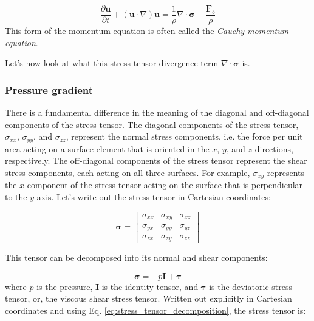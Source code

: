 \documentclass[12pt]{article}
\numberwithin{equation}{section}
\numberwithin{figure}{section}
\numberwithin{table}{section}
\begin{document}
\begin{equation}
  \frac{\partial \mathbf{u}}{\partial t} + (\mathbf{u} \cdot \nabla) \mathbf{u} =
  \frac{1}{\rho} \nabla \cdot \boldsymbol{\sigma} + \frac{\mathbf{F}_b}{\rho}
\end{equation}
This form of the momentum equation is often called the
\textit{Cauchy momentum equation}.

Let's now look at what this stress tensor divergence term
$\nabla \cdot \boldsymbol{\sigma}$ is.

\subsubsection{Pressure gradient}

There is a fundamental difference in the meaning of the diagonal and off-diagonal
components of the stress tensor.
The diagonal components of the stress tensor, $\sigma_{xx}$, $\sigma_{yy}$, and
$\sigma_{zz}$, represent the normal stress components, i.e. the force per unit
area acting on a surface element that is oriented in the $x$, $y$, and $z$
directions, respectively.
The off-diagonal components of the stress tensor represent the shear stress
components, each acting on all three surfaces.
For example, $\sigma_{xy}$ represents the $x$-component of the stress tensor
acting on the surface that is perpendicular to the $y$-axis.
Let's write out the stress tensor in Cartesian coordinates:

\begin{equation}
  \boldsymbol{\sigma} = \begin{bmatrix}
    \sigma_{xx} & \sigma_{xy} & \sigma_{xz} \\
    \sigma_{yx} & \sigma_{yy} & \sigma_{yz} \\
    \sigma_{zx} & \sigma_{zy} & \sigma_{zz}
  \end{bmatrix}
\end{equation}

This tensor can be decomposed into its normal and shear components:

\begin{equation}
  \boldsymbol{\sigma} = -p \mathbf{I} + \boldsymbol{\tau}
  \label{eq:stress_tensor_decomposition}
\end{equation}
where $p$ is the pressure, $\mathbf{I}$ is the identity tensor,
and $\boldsymbol{\tau}$ is the deviatoric stress tensor, or, the viscous shear
stress tensor.
Written out explicitly in Cartesian coordinates and using Eq.
\ref{eq:stress_tensor_decomposition}, the stress tensor is:
\end{document}
